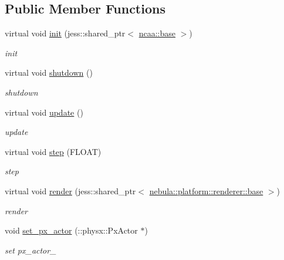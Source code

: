 \subsection*{Public Member Functions}
\begin{DoxyCompactItemize}
\item 
virtual void \hyperlink{classnebula_1_1content_1_1actor_1_1physics_1_1physx_1_1actor_a8785949a5e49754d32cdd14c447b4b5c}{init} (jess::shared\_\-ptr$<$ \hyperlink{classnebula_1_1content_1_1actor_1_1admin_1_1base}{ncaa::base} $>$)
\begin{DoxyCompactList}\small\item\em init \item\end{DoxyCompactList}\item 
virtual void \hyperlink{classnebula_1_1content_1_1actor_1_1physics_1_1physx_1_1actor_ad7c3bd724933af584b3884c2613b39a8}{shutdown} ()
\begin{DoxyCompactList}\small\item\em shutdown \item\end{DoxyCompactList}\item 
virtual void \hyperlink{classnebula_1_1content_1_1actor_1_1physics_1_1physx_1_1actor_a16da3f8769e927a8fe9ae353aa8411af}{update} ()
\begin{DoxyCompactList}\small\item\em update \item\end{DoxyCompactList}\item 
virtual void \hyperlink{classnebula_1_1content_1_1actor_1_1physics_1_1physx_1_1actor_aaa88b4b8982018bd8d0279b063f66826}{step} (FLOAT)
\begin{DoxyCompactList}\small\item\em step \item\end{DoxyCompactList}\item 
virtual void \hyperlink{classnebula_1_1content_1_1actor_1_1physics_1_1physx_1_1actor_aafea4a02068b40761e03c2a616971563}{render} (jess::shared\_\-ptr$<$ \hyperlink{classnebula_1_1platform_1_1renderer_1_1base}{nebula::platform::renderer::base} $>$)
\begin{DoxyCompactList}\small\item\em render \item\end{DoxyCompactList}\item 
void \hyperlink{classnebula_1_1content_1_1actor_1_1physics_1_1physx_1_1actor_af0bdfbbebc3b51c9057f97405364c70c}{set\_\-px\_\-actor} (::physx::PxActor $\ast$)
\begin{DoxyCompactList}\small\item\em set px\_\-actor\_\- \item\end{DoxyCompactList}\end{DoxyCompactItemize}
